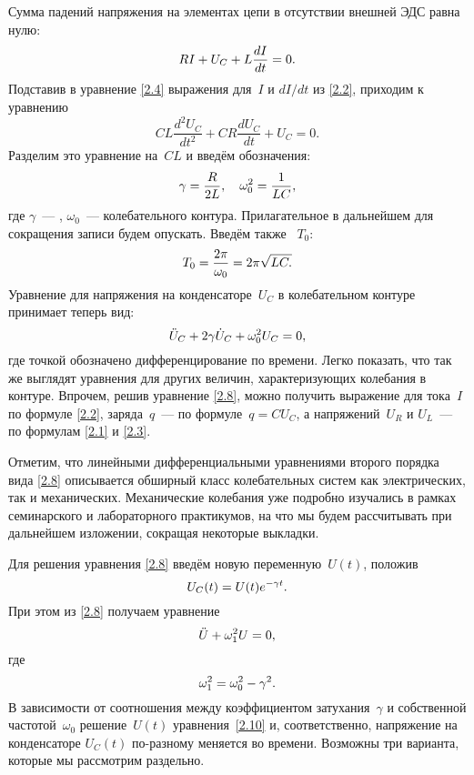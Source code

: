 Сумма падений напряжения на элементах цепи в отсутствии внешней ЭДС равна нулю:
\begin{equation}
	\eqmark{2.4}
	RI+U_C+L\dfrac{dI}{dt}=0.
\end{equation}
Подставив в уравнение \eqref{2.4} выражения для~$I$ и $dI/dt$ из \eqref{2.2},
приходим к уравнению
\begin{equation*}
	CL\dfrac{d^2U_C}{dt^2}+CR\dfrac{dU_C}{dt}+U_C=0.
\end{equation*}
Разделим это уравнение на~$CL$ и введём обозначения:
\begin{equation}\eqmark{2.6}
\gamma=\dfrac{R}{2L},~~~\omega_0^2=\dfrac{1}{LC},
\end{equation}
где $\gamma$~--- ,
$\omega_0$~---  колебательного контура.
Прилагательное   в дальнейшем для сокращения записи
будем опускать. Введём также  ~$T_0$:
\begin{equation}\eqmark{2.7}
T_0=\dfrac{2\pi}{\omega_0}=2\pi\sqrt{LC.}
\end{equation}
Уравнение для напряжения на конденсаторе~$U_C$ в колебательном контуре принимает
теперь вид:
\begin{equation}\eqmark{2.8}
\ddot{U}_C+2\gamma\dot{U}_C+\omega_0^2U_C=0,
\end{equation}
где точкой обозначено дифференцирование по времени. Легко показать, что так же
выглядят уравнения для других величин, характеризующих колебания в контуре.
Впрочем, решив уравнение \eqref{2.8}, можно получить выражение для тока~$I$ по
формуле \eqref{2.2}, заряда~$q$~--- по формуле~$q=CU_C$, а напряжений~$U_R$ и
$U_L$~--- по формулам \eqref{2.1} и \eqref{2.3}.

Отметим, что линейными дифференциальными уравнениями второго порядка вида
\eqref{2.8} описывается обширный класс колебательных систем как электрических,
так и механических. Механические колебания уже подробно изучались в рамках
семинарского и лабораторного практикумов, на что мы будем рассчитывать при
дальнейшем изложении, сокращая некоторые выкладки.

Для решения уравнения \eqref{2.8} введём новую переменную~$U(t)$, положив
\begin{equation}\eqmark{2.9}
U_C(t)=U(t)e^{-\gamma t}.
\end{equation}
При этом из \eqref{2.8} получаем уравнение
\begin{equation}\eqmark{2.10}
\ddot{U}+\omega_1^2U=0,
\end{equation}
где
\begin{equation}\eqmark{2.11}
\omega_1^2=\omega_0^2-\gamma^2.
\end{equation}
В зависимости от соотношения между коэффициентом затухания~$\gamma$ и
собственной частотой~$\omega_0$ решение~$U(t)$ уравнения~\eqref{2.10} и, соответственно, напряжение на конденсаторе $U_C(t)$ по-разному меняется во времени.
Возможны три варианта, которые мы рассмотрим раздельно.

